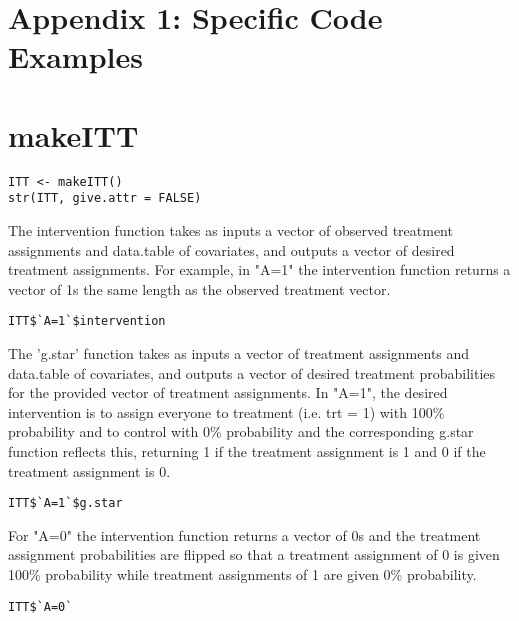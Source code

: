 \documentclass{report}
\newcommand{\1}{\ensuremath{\mathbf{1}}}
\begin{document}
\section{Appendix 1: Specific Code Examples}
\label{sec:org21696a5}
\section{makeITT}

\begin{lstlisting}
ITT <- makeITT()
str(ITT, give.attr = FALSE)
\end{lstlisting}

The intervention function takes as inputs a vector of observed treatment assignments and data.table of covariates, and outputs a vector of desired treatment assignments. For example, in "A=1" the intervention function returns a vector of 1s the same length as the observed treatment vector.

\begin{lstlisting}
ITT$`A=1`$intervention
\end{lstlisting}

The 'g.star' function takes as inputs a vector of treatment assignments and data.table of covariates, and outputs a vector of desired treatment probabilities for the provided vector of treatment assignments. In "A=1", the desired intervention is to assign everyone to treatment (i.e. trt = 1) with 100\% probability and to control with 0\% probability and the corresponding g.star function reflects this, returning 1 if the treatment assignment is 1 and 0 if the treatment assignment is 0.

\begin{lstlisting}
ITT$`A=1`$g.star
\end{lstlisting}


For "A=0" the intervention function returns a vector of 0s and the treatment assignment probabilities are flipped so that a treatment assignment of 0 is given 100\% probability while treatment assignments of 1 are given 0\% probability.

\begin{lstlisting}
ITT$`A=0`
\end{lstlisting}
\end{document}
